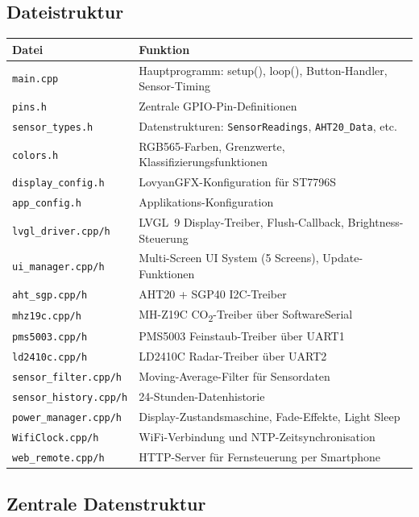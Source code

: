 \documentclass[a4paper,11pt]{article}
\begin{document}
\subsection{Dateistruktur}

\begin{tabularx}{\textwidth}{lX}
\toprule
\rowcolor{tableheader}
\textbf{Datei} & \textbf{Funktion} \\
\midrule
\texttt{main.cpp} & Hauptprogramm: setup(), loop(), Button-Handler, Sensor-Timing \\
\texttt{pins.h} & Zentrale GPIO-Pin-Definitionen \\
\texttt{sensor\_types.h} & Datenstrukturen: \texttt{SensorReadings}, \texttt{AHT20\_Data}, etc. \\
\texttt{colors.h} & RGB565-Farben, Grenzwerte, Klassifizierungsfunktionen \\
\texttt{display\_config.h} & LovyanGFX-Konfiguration für ST7796S \\
\texttt{app\_config.h} & Applikations-Konfiguration \\
\texttt{lvgl\_driver.cpp/h} & LVGL~9 Display-Treiber, Flush-Callback, Brightness-Steuerung \\
\texttt{ui\_manager.cpp/h} & Multi-Screen UI System (5 Screens), Update-Funktionen \\
\texttt{aht\_sgp.cpp/h} & AHT20 + SGP40 I2C-Treiber \\
\texttt{mhz19c.cpp/h} & MH-Z19C CO\textsubscript{2}-Treiber über SoftwareSerial \\
\texttt{pms5003.cpp/h} & PMS5003 Feinstaub-Treiber über UART1 \\
\texttt{ld2410c.cpp/h} & LD2410C Radar-Treiber über UART2 \\
\texttt{sensor\_filter.cpp/h} & Moving-Average-Filter für Sensordaten \\
\texttt{sensor\_history.cpp/h} & 24-Stunden-Datenhistorie \\
\texttt{power\_manager.cpp/h} & Display-Zustandsmaschine, Fade-Effekte, Light Sleep \\
\texttt{WifiClock.cpp/h} & WiFi-Verbindung und NTP-Zeitsynchronisation \\
\texttt{web\_remote.cpp/h} & HTTP-Server für Fernsteuerung per Smartphone \\
\bottomrule
\end{tabularx}

\subsection{Zentrale Datenstruktur}
\end{document}
